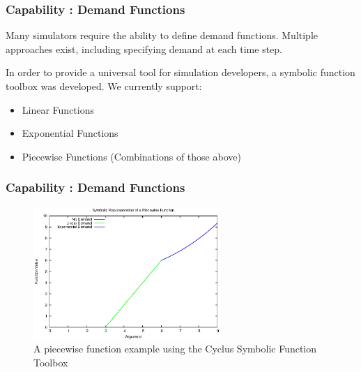 
\begin{frame}
  \frametitle{Capability : Demand Functions}
  Many simulators require the ability to define demand functions. 
  Multiple approaches exist, including specifying demand at each time
  step. 

  \vspace{0.2cm}

  In order to provide a universal tool for simulation developers, a 
  symbolic function toolbox was developed. We currently support:
  \begin{itemize}
    \item Linear Functions
    \item Exponential Functions
    \item Piecewise Functions (Combinations of those above)
  \end{itemize}
\end{frame}

\begin{frame}[ctb!]
  \frametitle{Capability : Demand Functions}
  \begin{figure}[htbp!]
    \begin{center}
      \includegraphics[height=5cm]{piecewise.eps}
    \caption{A piecewise function example using the Cyclus Symbolic 
      Function Toolbox}
    \label{fig:piecewisefunction}
    \end{center}
  \end{figure}
\end{frame}


